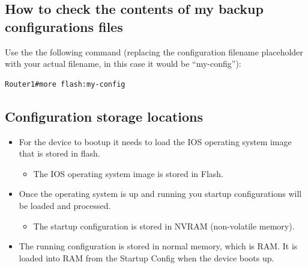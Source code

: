 \subsection{How to check the contents of my backup configurations files}
Use the the following command (replacing the configuration filename placeholder with your actual filename, in this case it would be ``my-config''):
\begin{verbatim}
Router1#more flash:my-config
\end{verbatim}

\subsection{Configuration storage locations}
\begin{itemize}
    \item For the device to bootup it needs to load the IOS operating system image that is stored in flash.
        \begin{itemize}
            \item The IOS operating system image is stored in Flash.
        \end{itemize}
    \item Once the operating system is up and running you startup configurations will be loaded and processed.
        \begin{itemize}
            \item The startup configuration is stored in NVRAM (non-volatile memory).
        \end{itemize}
    
    \item The running configuration is stored in normal memory, which is RAM. It is loaded into RAM from the Startup Config when the device boots up.
\end{itemize}

